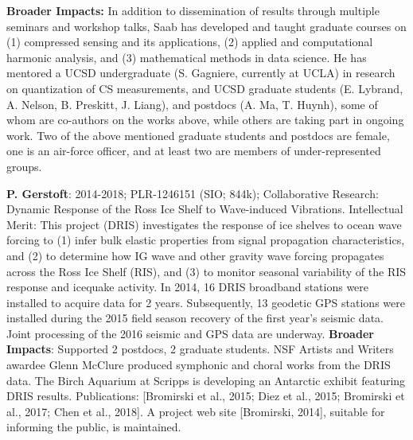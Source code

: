  {\bf Broader Impacts: }  In addition to dissemination of results through multiple seminars and workshop talks, Saab has developed and taught graduate courses on (1) compressed sensing and its applications, (2) applied and computational harmonic analysis, and (3) mathematical methods in data science. He has  mentored a UCSD undergraduate (S. Gagniere, currently at UCLA) in research on quantization of CS measurements, and UCSD graduate students (E. Lybrand, A. Nelson, B. Preskitt, J. Liang), and postdocs (A. Ma, T. Huynh),  some of whom are co-authors on the works above, while others are taking part in ongoing work. Two of the above mentioned graduate students and postdocs are female, one is an air-force officer, and at least two are members of under-represented groups.%

{\bf  P. Gerstoft}: 2014-2018; PLR-1246151 (SIO; 844k); Collaborative Research: Dynamic Response of the Ross Ice Shelf to Wave-induced Vibrations. Intellectual Merit: This project (DRIS) investigates the response of ice shelves to ocean wave forcing to (1) infer bulk elastic properties from signal propagation characteristics, and (2) to determine how IG wave and other gravity wave forcing propagates across the Ross Ice Shelf (RIS), and (3) to monitor seasonal variability of the RIS response and icequake activity. In 2014, 16 DRIS broadband stations were installed to acquire data for 2 years. Subsequently, 13 geodetic GPS stations were installed during the 2015 field season recovery of the first year’s seismic data. Joint processing of the 2016 seismic and GPS data are underway. {\bf Broader Impacts}: Supported 2 postdocs, 2 graduate students. NSF Artists and Writers awardee Glenn McClure produced symphonic and choral works from the DRIS data. The Birch Aquarium at Scripps is developing an Antarctic exhibit featuring DRIS results. Publications: [Bromirski et al., 2015; Diez et al., 2015; Bromirski et al., 2017; Chen et al., 2018]. A project web site [Bromirski, 2014], suitable for informing the public, is maintained. 



